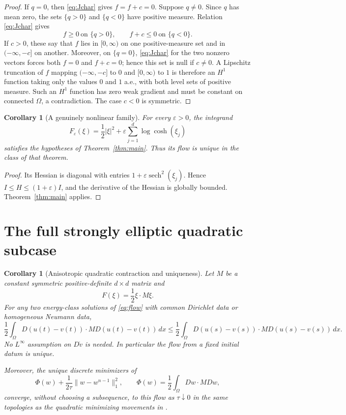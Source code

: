 \documentclass[11pt]{article}
\newtheorem{corollary}[theorem]{Corollary}
\newcommand{\Om}{\Omega}
\begin{document}
\begin{proof}
If $q=0$, then \eqref{eq:Jchar} gives $f=f+c=0$.  Suppose $q\ne0$.
Since $q$ has mean zero, the sets $\{q>0\}$ and $\{q<0\}$ have positive
measure.  Relation \eqref{eq:Jchar} gives
\[
 f\ge0\ \text{on }\{q>0\},
 \qquad f+c\le0\ \text{on }\{q<0\}.
\]
If $c>0$, these say that $f$ lies in $[0,\infty)$ on one positive-measure
set and in $(-\infty,-c]$ on another.  Moreover, on $\{q=0\}$,
\eqref{eq:Jchar} for the two nonzero vectors forces both $f=0$ and
$f+c=0$; hence this set is null if $c\ne0$.  A Lipschitz truncation of
$f$ mapping $(-\infty,-c]$ to $0$ and $[0,\infty)$ to $1$ is therefore
an $H^1$ function taking only the values $0$ and $1$ a.e., with both
level sets of positive measure.  Such an $H^1$ function has zero weak
gradient and must be constant on connected $\Om$, a contradiction.
The case $c<0$ is symmetric.
\end{proof}

\begin{corollary}[A genuinely nonlinear family]\label{cor:nonlinear}
For every $\varepsilon>0$, the integrand
\[
 F_\varepsilon(\xi)=\frac12|\xi|^2+
   \varepsilon\sum_{j=1}^d\log\cosh(\xi_j)
\]
satisfies the hypotheses of Theorem~\ref{thm:main}.  Thus its flow is
unique in the class of that theorem.
\end{corollary}

\begin{proof}
Its Hessian is diagonal with entries
$1+\varepsilon\operatorname{sech}^2(\xi_j)$.  Hence
$I\le H\le(1+\varepsilon)I$, and the derivative of the Hessian is globally
bounded.  Theorem~\ref{thm:main} applies.
\end{proof}

\section{The full strongly elliptic quadratic subcase}

\begin{corollary}[Anisotropic quadratic contraction and uniqueness]
\label{cor:quadratic}
Let $M$ be a constant symmetric positive-definite $d\times d$ matrix and
\[
 F(\xi)=\frac12\xi\cdot M\xi.
\]
For any two energy-class solutions of \eqref{eq:flow} with common
Dirichlet data or homogeneous Neumann data,
\begin{equation}\label{eq:quadraticcontraction}
 \frac12\int_\Om D(u(t)-v(t))\cdot M D(u(t)-v(t))\,dx
 \le
 \frac12\int_\Om D(u(s)-v(s))\cdot M D(u(s)-v(s))\,dx.
\end{equation}
No $L^\infty$ assumption on $D\dot v$ is needed.  In particular the
flow from a fixed initial datum is unique.

Moreover, the unique discrete minimizers of
\[
 \Phi(w)+\frac1{2\tau}\|w-w^{n-1}\|_1^2,
 \qquad \Phi(w)=\frac12\int_\Om Dw\cdot M Dw,
\]
converge, without choosing a subsequence, to this flow as $\tau\downarrow0$
in the same topologies as the quadratic minimizing movements in \cite{CN}.
\end{corollary}
\end{document}
